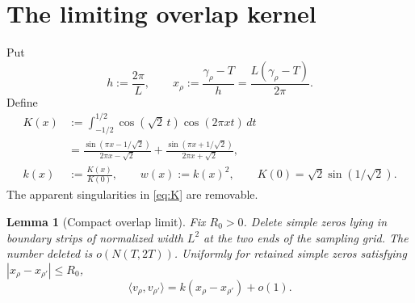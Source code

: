\documentclass[11pt]{article}
\newtheorem{lemma}[theorem]{Lemma}
\begin{document}
\section{The limiting overlap kernel}\label{sec:kernel}

Put
\[
 h:=\frac{2\pi}{L},\qquad
 x_\rho:=\frac{\gamma_\rho-T}{h}
 =\frac{L(\gamma_\rho-T)}{2\pi}.
\]
Define
\begin{align}
 K(x)
 &:=\int_{-1/2}^{1/2}\cos(\sqrt2\,t)\cos(2\pi xt)\,dt \label{eq:Kint}\\
 &=\frac{\sin(\pi x-1/\sqrt2)}{2\pi x-\sqrt2}
  +\frac{\sin(\pi x+1/\sqrt2)}{2\pi x+\sqrt2}, \label{eq:K}\\
 k(x)&:=\frac{K(x)}{K(0)},\qquad
 w(x):=k(x)^2,\qquad
 K(0)=\sqrt2\sin(1/\sqrt2). \label{eq:kw}
\end{align}
The apparent singularities in \eqref{eq:K} are removable.

\begin{lemma}[Compact overlap limit]\label{lem:kernel}
Fix $R_0>0$.  Delete simple zeros lying in boundary strips of normalized
width $L^2$ at the two ends of the sampling grid.  The number deleted is
$o(N(T,2T))$.  Uniformly for retained simple zeros satisfying
$|x_\rho-x_{\rho'}|\le R_0$,
\begin{equation}\label{eq:kernel-limit}
 \langle v_\rho,v_{\rho'}\rangle
 =k(x_\rho-x_{\rho'})+o(1).
\end{equation}
\end{lemma}
\end{document}
